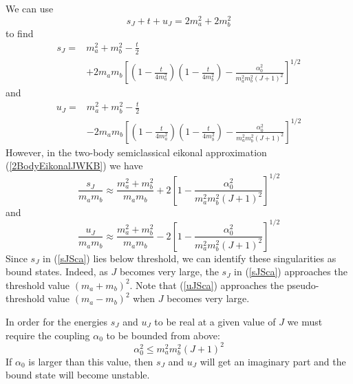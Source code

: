 We can use
\begin{equation}
	s_{J} + t + u_{J} = 2m_{a}^{2} + 2m_{b}^{2}
\end{equation}
to find
\begin{equation}
\begin{split}
	s_{J} = {}& m_{a}^{2} + m_{b}^{2} - \frac{t}{2} \\
	&+ 2 m_{a} m_{b} \left[ \left(1 - \frac{t}{4 m_{a}^{2}} \right) \left( 1 - \frac{t}{4 m_{b}^{2}} \right) - \frac{\alpha_{0}^{2}}{m_{a}^{2} m_{b}^{2} (J + 1)^{2}} \right]^{1/2}
\end{split} \label{sJtSca}
\end{equation}
and
\begin{equation}
\begin{split}
	u_{J} = {}& m_{a}^{2} + m_{b}^{2} - \frac{t}{2} \\
	&- 2 m_{a} m_{b} \left[ \left(1 - \frac{t}{4 m_{a}^{2}} \right) \left( 1 - \frac{t}{4 m_{b}^{2}} \right) - \frac{\alpha_{0}^{2}}{m_{a}^{2} m_{b}^{2} (J + 1)^{2}} \right]^{1/2}
\end{split} \label{uJtSca}
\end{equation}
However, in the two-body semiclassical eikonal approximation (\ref{2BodyEikonalJWKB}) we have
\begin{equation}
	\frac{s_{J}}{m_{a} m_{b}} \approx \frac{m_{a}^{2} + m_{b}^{2}}{m_{a} m_{b}} + 2 \left[ 1 - \frac{\alpha_{0}^{2}}{m_{a}^{2} m_{b}^{2} (J + 1)^{2}} \right]^{1/2} \label{sJSca}
\end{equation}
and
\begin{equation}
	\frac{u_{J}}{m_{a} m_{b}} \approx \frac{m_{a}^{2} + m_{b}^{2}}{m_{a} m_{b}} - 2 \left[ 1 - \frac{\alpha_{0}^{2}}{m_{a}^{2} m_{b}^{2} (J + 1)^{2}} \right]^{1/2} \label{uJSca}
\end{equation}
Since $s_{J}$ in (\ref{sJSca}) lies below threshold, we can identify these singularities as bound states. Indeed, as $J$ becomes very large, the $s_{J}$ in (\ref{sJSca}) approaches the threshold value $(m_{a} + m_{b})^{2}$. Note that (\ref{uJSca}) approaches the pseudo-threshold value $(m_{a} - m_{b})^{2}$ when $J$ becomes very large.

In order for the energies $s_{J}$ and $u_{J}$ to be real at a given value of $J$ we must require the coupling $\alpha_{0}$ to be bounded from above:
\begin{equation}
	\alpha_{0}^{2} \leq m_{a}^{2} m_{b}^{2} (J + 1)^{2}
\end{equation}
If $\alpha_{0}$ is larger than this value, then $s_{J}$ and $u_{J}$ will get an imaginary part and the bound state will become unstable.

